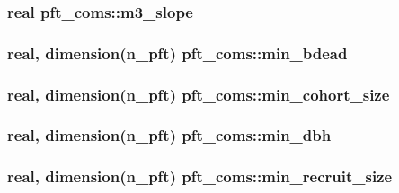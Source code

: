 \subsubsection[{m3\+\_\+slope}]{\setlength{\rightskip}{0pt plus 5cm}real pft\+\_\+coms\+::m3\+\_\+slope}\label{namespacepft__coms_a27553d075979c77be9aceaf78a289109}
\hypertarget{namespacepft__coms_af689fc3f0c233590c72175bf99d1c8f6}{}
\subsubsection[{min\+\_\+bdead}]{\setlength{\rightskip}{0pt plus 5cm}real, dimension(n\+\_\+pft) pft\+\_\+coms\+::min\+\_\+bdead}\label{namespacepft__coms_af689fc3f0c233590c72175bf99d1c8f6}
\hypertarget{namespacepft__coms_ae271b74cd105b2cf539a630a97cfc185}{}
\subsubsection[{min\+\_\+cohort\+\_\+size}]{\setlength{\rightskip}{0pt plus 5cm}real, dimension(n\+\_\+pft) pft\+\_\+coms\+::min\+\_\+cohort\+\_\+size}\label{namespacepft__coms_ae271b74cd105b2cf539a630a97cfc185}
\hypertarget{namespacepft__coms_a6290d41cd79d6f8ac7819f9bf06cad60}{}
\subsubsection[{min\+\_\+dbh}]{\setlength{\rightskip}{0pt plus 5cm}real, dimension(n\+\_\+pft) pft\+\_\+coms\+::min\+\_\+dbh}\label{namespacepft__coms_a6290d41cd79d6f8ac7819f9bf06cad60}
\hypertarget{namespacepft__coms_a4a008038dd34f2531f2ca7637c6e74b0}{}
\subsubsection[{min\+\_\+recruit\+\_\+size}]{\setlength{\rightskip}{0pt plus 5cm}real, dimension(n\+\_\+pft) pft\+\_\+coms\+::min\+\_\+recruit\+\_\+size}\label{namespacepft__coms_a4a008038dd34f2531f2ca7637c6e74b0}
\hypertarget{namespacepft__coms_a70607e766522bb0ddd5329aa60d6b5e7}{}
